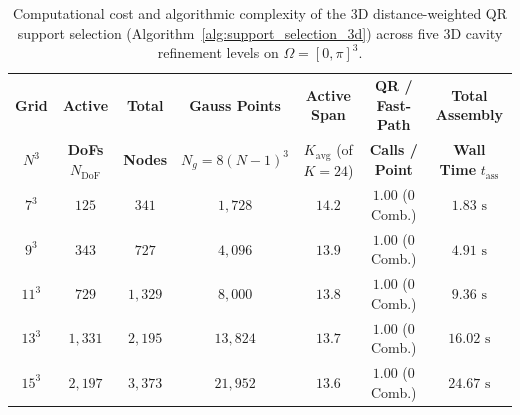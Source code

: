 \documentclass[preprint,12pt]{elsarticle}
\begin{document}
\begin{table}[htbp]
\centering
\caption{Computational cost and algorithmic complexity of the 3D distance-weighted QR support selection (Algorithm~\ref{alg:support_selection_3d}) across five 3D cavity refinement levels on $\Omega = [0,\pi]^3$.}
\label{tab:support_cost_3d}
\footnotesize
\begin{tabular}{ccccccc}
\toprule
\textbf{Grid} & \textbf{Active} & \textbf{Total} & \textbf{Gauss Points} & \textbf{Active Span} & \textbf{QR / Fast-Path} & \textbf{Total Assembly} \\
$N^3$ & \textbf{DoFs} $N_{\text{DoF}}$ & \textbf{Nodes} & $N_g = 8(N-1)^3$ & $K_{\text{avg}}$ (of $K=24$) & \textbf{Calls / Point} & \textbf{Wall Time} $t_{\text{ass}}$ \\
\midrule
$7^3$  & $125$   & $341$   & $1{,}728$  & $14.2$ & $1.00$ ($0$ Comb.) & $1.83\text{ s}$ \\
$9^3$  & $343$   & $727$   & $4{,}096$  & $13.9$ & $1.00$ ($0$ Comb.) & $4.91\text{ s}$ \\
$11^3$ & $729$   & $1{,}329$ & $8{,}000$  & $13.8$ & $1.00$ ($0$ Comb.) & $9.36\text{ s}$ \\
$13^3$ & $1{,}331$ & $2{,}195$ & $13{,}824$ & $13.7$ & $1.00$ ($0$ Comb.) & $16.02\text{ s}$ \\
$15^3$ & $2{,}197$ & $3{,}373$ & $21{,}952$ & $13.6$ & $1.00$ ($0$ Comb.) & $24.67\text{ s}$ \\
\bottomrule
\end{tabular}
\end{table}
\end{document}
